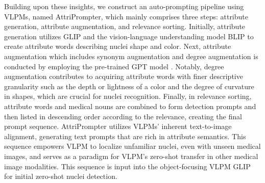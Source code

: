 \documentclass[journal,twoside,web]{ieeecolor}
\begin{document}
Building upon these insights, we construct an auto-prompting pipeline using VLPMs, named AttriPrompter, which mainly comprises three steps: attribute generation, attribute augmentation, and relevance sorting. Initially, attribute generation utilizes GLIP and the vision-language understanding model BLIP \cite{li2022blip} to create attribute words describing nuclei shape and color. Next, attribute augmentation which includes synonym augmentation and degree augmentation is conducted by employing the pre-trained GPT model \cite{radford2019language}. Notably, degree augmentation contributes to acquiring attribute words with finer descriptive granularity such as the depth or lightness of a color and the degree of curvature in shapes, which are crucial for nuclei recognition. Finally, in relevance sorting, attribute words and medical nouns are combined to form detection prompts and then listed in descending order according to the relevance, creating the final prompt sequence. AttriPrompter utilizes VLPMs' inherent text-to-image alignment, generating text prompts that are rich in attribute semantics. This sequence empowers VLPM to localize unfamiliar nuclei, even with unseen medical images, and serves as a paradigm for VLPM's zero-shot transfer in other medical image modalities. This sequence is input into the object-focusing VLPM GLIP for initial zero-shot nuclei detection.

\end{document}
